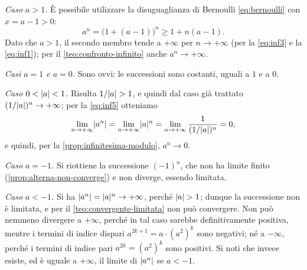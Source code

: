 \begin{dimostrazione}
\emph{Caso $a>1$.} È possibile utilizzare la disuguaglianza di Bernoulli
\eqref{eq:bernoulli} con $x=a-1>0$:
\begin{equation}\label{eq:an-bernoulli}
  a^{n}=\bigl(1+(a-1)\bigr)^{n}\ge1+n(a-1).
\end{equation}
Dato che $a>1$, il secondo membro tende a $+\infty$ per $n\to+\infty$ (per la
\eqref{eq:inf3} e la \eqref{eq:inf1}); per il \cref{teo:confronto-infinito} anche
$a^{n}\to+\infty$.

\emph{Casi $a=1$ e $a=0$.} Sono ovvi: le successioni sono costanti, uguali a $1$ e a $0$.

\emph{Caso $0<\lvert a\rvert<1$.} Risulta $1/\lvert a\rvert>1$, e quindi dal caso già trattato
$(1/\lvert a\rvert)^{n}\to+\infty$; per la \eqref{eq:inf5} otteniamo
\begin{equation}\label{eq:an-zero}
  \lim_{n\to+\infty}\lvert a^{n}\rvert=\lim_{n\to+\infty}\lvert a\rvert^{n}=\lim_{n\to+\infty}\frac{1}{(1/\lvert a\rvert)^{n}}=0,
\end{equation}
e quindi, per la \cref{prop:infinitesima-modulo}, $a^{n}\to0$.

\emph{Caso $a=-1$.} Si riottiene la successione $(-1)^{n}$, che non ha limite finito
(\cref{prop:alterna-non-converge}) e non diverge, essendo limitata.

\emph{Caso $a<-1$.} Si ha $\lvert a^{n}\rvert=\lvert a\rvert^{n}\to+\infty$, perché $\lvert a\rvert>1$; dunque la
successione non è limitata, e per il \cref{teo:convergente-limitata} non può convergere.
Non può nemmeno divergere a $+\infty$, perché in tal caso sarebbe definitivamente
positiva, mentre i termini di indice dispari $a^{2k+1}=a\cdot(a^{2})^{k}$ sono negativi;
né a $-\infty$, perché i termini di indice pari $a^{2k}=(a^{2})^{k}$ sono positivi. Si noti
che invece esiste, ed è uguale a $+\infty$, il limite di $\lvert a^{n}\rvert$ se $a<-1$.
\end{dimostrazione}

\begin{marginfigure}
\centering
{}
\caption{Successioni geometriche: per $a>1$ divergono (anche se lentamente, come
$1{,}08^{n}$), per $\abs a<1$ tendono a zero, eventualmente oscillando se $a<0$.}
\end{marginfigure}

